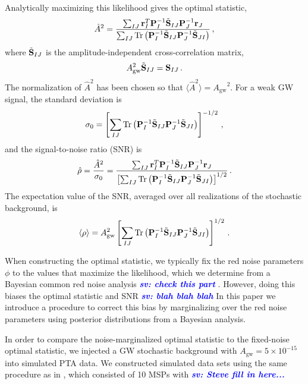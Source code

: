 \documentclass[twocolumn,aps,prd,superscriptaddress]{revtex4-1}
\DeclareMathOperator{\Tr}{Tr}
\newcommand{\sv}[1]{\textcolor{blue}{\it{\textbf{sv: #1}}} }
\newcommand{\Agw}{\ensuremath{A_\mathrm{gw}}}
\begin{document}
Analytically maximizing this likelihood gives the optimal statistic,
\begin{equation}
	\hat{A}^2 = \frac{\sum_{IJ} {\bf{r}}_I^T {\bf{P}}_I^{-1} \tilde{{\bf{S}}}_{IJ} {\bf{P}}_J^{-1} {\bf{r}}_J}{\sum_{IJ} \Tr \left( {\bf{P}}_I^{-1} \tilde{{\bf{S}}}_{IJ} {\bf{P}}_J^{-1} \tilde{{\bf{S}}}_{JI} \right) } \,,
\end{equation}
where $\tilde{{\bf{S}}}_{IJ}$ is the amplitude-independent cross-correlation matrix,
\begin{equation}
	\Agw^2 \tilde{{\bf{S}}}_{IJ} = {\bf{S}}_{IJ} \,.
\end{equation}
The normalization of $\hat{A}^2$ has been chosen so that 
$\langle \hat{A}^2 \rangle = \Agw^2$. 
For a weak GW signal, the standard deviation is 
\begin{equation}
	\sigma_0 = \left[ \sum_{IJ} \Tr \left( {\bf{P}}_I^{-1} \tilde{{\bf{S}}}_{IJ} {\bf{P}}_J^{-1} \tilde{{\bf{S}}}_{JI} \right) \right]^{-1/2} \,,
\end{equation}
and the signal-to-noise ratio (SNR) is
\begin{equation}
	\hat{\rho} = \frac{\hat{A}^2}{\sigma_0} = \frac{\sum_{IJ} {\bf{r}}_I^T {\bf{P}}_I^{-1} \tilde{{\bf{S}}}_{IJ} {\bf{P}}_J^{-1} {\bf{r}}_J}{\left[ \sum_{IJ} \Tr \left( {\bf{P}}_I^{-1} \tilde{{\bf{S}}}_{IJ} {\bf{P}}_J^{-1} \tilde{{\bf{S}}}_{JI} \right) \right]^{1/2}} \,.
\end{equation}
The expectation value of the SNR, averaged over all realizations of the stochastic background, is
\begin{equation}
	\left\langle \rho \right\rangle = \Agw^2 \left[ \sum_{IJ} \Tr\left( {\bf{P}}_I^{-1} \tilde{{\bf{S}}}_{IJ} {\bf{P}}_J^{-1} \tilde{{\bf{S}}}_{JI} \right) \right]^{1/2} \,.
\end{equation}

When constructing the optimal statistic, we typically fix the red noise parameters $\phi$ to the values that 
maximize the likelihood, which we determine from a Bayesian common red noise analysis 
\sv{check this part}. However, 
doing this biases the optimal statistic and SNR \sv{blah blah blah} 
In this paper we introduce a procedure to correct this bias by 
marginalizing over the red noise parameters using 
posterior distributions from a Bayesian analysis.

In order to compare the noise-marginalized optimal statistic to the 
fixed-noise optimal statistic, we injected a GW stochastic background with 
$\Agw = 5 \times 10^{-15}$ into simulated PTA data. 
We constructed simulated data sets using the same procedure as in \citet{tlb+2017}, 
which consisted of 10 MSPs with \sv{Steve fill in here...}
\end{document}
